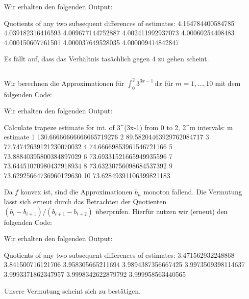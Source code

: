 

Wir erhalten den folgenden Output:

\begin{consoleoutput}
Quotients of any two subsequent differences of estimates:
4.164784400584785
4.039182316416593
4.009677144752887
4.002411992937073
4.00060254408483
4.000150607761501
4.000037649528035
4.000009414842847
\end{consoleoutput}

Es fällt auf, dass das Verhältnis tasächlich gegen $4$ zu gehen scheint.





\subsection{}

Wir berechnen die Approximationen für $\int_0^2 3^{3x-1} \,\text{d}x$ für $m = 1, \dotsc, 10$ mit dem folgenden Code:



Wir erhalten den folgenden Output:

\begin{consoleoutput}
Calculate trapeze estimate for int. of 3^(3x-1) from 0 to 2, 2^m intervals:
 m      estimate
 1      130.66666666666665719276
 2       89.58204463929762084717
 3       77.74742639121230070032
 4       74.66669853961546721166
 5       73.88840395800384897029
 6       73.69331521665949935596
 7       73.64451070980437918934
 8       73.63230756098684537392
 9       73.62925664736960129630
10       73.62849391106399821183
\end{consoleoutput}


Da $f$ konvex ist, sind die Approximationen $b_n$ monoton fallend.
Die Vermutung lässt sich erneut durch das Betrachten der Quotienten $(b_i - b_{i+1})/(b_{i+1} - b_{i+2})$ überprüfen.
Hierfür nutzen wir (erneut) den folgenden Code:



Wir erhalten den folgenden Output:

\begin{consoleoutput}
Quotients of any two subsequent differences of estimates:
3.471562932248868
3.841500716121706
3.958305665211694
3.9894387356667425
3.9973509398114637
3.9993371862347957
3.9998342622879792
3.999958563440565
\end{consoleoutput}

Unsere Vermutung scheint sich zu bestätigen.
